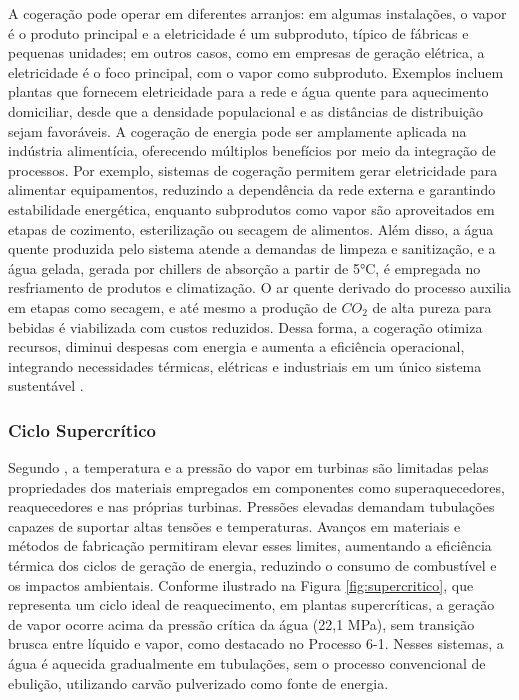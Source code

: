 \documentclass[
	article,			%
	11pt,				%
	oneside,			%
	a4paper,			%
	english,			%
	brazil,				%
	sumario=tradicional
	]{abntex2}
\begin{document}
A cogeração pode operar em diferentes arranjos: em algumas instalações, o vapor é o produto principal e a eletricidade é um subproduto, típico de fábricas e pequenas unidades; em outros casos, como em empresas de geração elétrica, a eletricidade é o foco principal, com o vapor como subproduto. Exemplos incluem plantas que fornecem eletricidade para a rede e água quente para aquecimento domiciliar, desde que a densidade populacional e as distâncias de distribuição sejam favoráveis.
A cogeração de energia pode ser amplamente aplicada na indústria alimentícia, oferecendo múltiplos benefícios por meio da integração de processos. Por exemplo, sistemas de cogeração permitem gerar eletricidade para alimentar equipamentos, reduzindo a dependência da rede externa e garantindo estabilidade energética, enquanto subprodutos como vapor são aproveitados em etapas de cozimento, esterilização ou secagem de alimentos. Além disso, a água quente produzida pelo sistema atende a demandas de limpeza e sanitização, e a água gelada, gerada por chillers de absorção a partir de 5°C, é empregada no resfriamento de produtos e climatização. O ar quente derivado do processo auxilia em etapas como secagem, e até mesmo a produção de $CO_2$ de alta pureza para bebidas é viabilizada com custos reduzidos. Dessa forma, a cogeração otimiza recursos, diminui despesas com energia e aumenta a eficiência operacional, integrando necessidades térmicas, elétricas e industriais em um único sistema sustentável \cite{Ecogen_Cogeracao_2025}.

\subsubsection{Ciclo Supercrítico}

Segundo , a temperatura e a pressão do vapor em turbinas são limitadas pelas propriedades dos materiais empregados em componentes como superaquecedores, reaquecedores e nas próprias turbinas. Pressões elevadas demandam tubulações capazes de suportar altas tensões e temperaturas. Avanços em materiais e métodos de fabricação permitiram elevar esses limites, aumentando a eficiência térmica dos ciclos de geração de energia, reduzindo o consumo de combustível e os impactos ambientais. Conforme ilustrado na Figura \ref{fig:supercritico}, que representa um ciclo ideal de reaquecimento, em plantas supercríticas, a geração de vapor ocorre acima da pressão crítica da água (22,1 MPa), sem transição brusca entre líquido e vapor, como destacado no Processo 6-1. Nesses sistemas, a água é aquecida gradualmente em tubulações, sem o processo convencional de ebulição, utilizando carvão pulverizado como fonte de energia.
\end{document}
